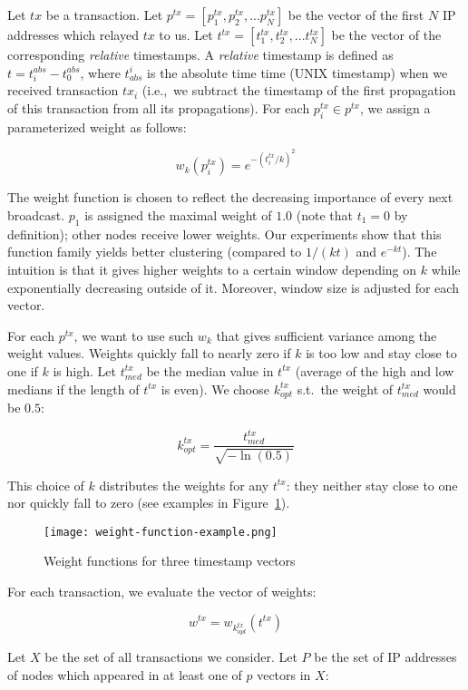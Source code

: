 Let $tx$ be a transaction.
Let $p^{tx} = [p^{tx}_1, p^{tx}_2, ... p^{tx}_N]$ be the vector of the first $N$ IP addresses which relayed $tx$ to us.
Let $t^{tx} = [t^{tx}_1, t^{tx}_2, ... t^{tx}_N]$ be the vector of the corresponding \textit{relative} timestamps.
A \textit{relative} timestamp is defined as $t = t^{abs}_i - t^{abs}_0$, where $t_{abs}^i$ is the absolute time time (UNIX timestamp) when we received transaction $tx_i$ (i.e.,~we subtract the timestamp of the first propagation of this transaction from all its propagations).
For each $p^{tx}_i \in p^{tx}$, we assign a parameterized weight as follows:

\[
w_k(p^{tx}_i) = e^{-(t^{tx}_i/k)^2}
\]

The weight function is chosen to reflect the decreasing importance of every next broadcast.
$p_1$ is assigned the maximal weight of $1.0$ (note that $t_1=0$ by definition); other nodes receive lower weights.
Our experiments show that this function family yields better clustering (compared to $1/(kt)$ and $e^{-kt}$).
The intuition is that it gives higher weights to a certain window depending on $k$ while exponentially decreasing outside of it.
Moreover, window size is adjusted for each vector.

For each $p^{tx}$, we want to use such $w_k$ that gives sufficient variance among the weight values.
Weights quickly fall to nearly zero if $k$ is too low and stay close to one if $k$ is high.
Let $t^{tx}_{med}$ be the median value in $t^{tx}$ (average of the high and low medians if the length of $t^{tx}$ is even).
We choose $k^{tx}_{opt}$ s.t.~the weight of $t^{tx}_{med}$ would be $0.5$:

\[
k^{tx}_{opt} = \frac{t^{tx}_{med}}{\sqrt{-\ln(0.5)}}
\]

This choice of $k$ distributes the weights for any $t^{tx}$: they neither stay close to one nor quickly fall to zero (see examples in Figure~\ref{fig:weight}).
\begin{figure}
	\centering
	\texttt{[image: weight-function-example.png]}
	\caption{Weight functions for three timestamp vectors}\label{fig:weight}
\end{figure}
For each transaction, we evaluate the vector of weights:

\[
w^{tx} = w_{k^{tx}_{opt}}(t^{tx})
\]

Let $X$ be the set of all transactions we consider.
Let $P$ be the set of IP addresses of nodes which appeared in at least one of $p$ vectors in $X$:

